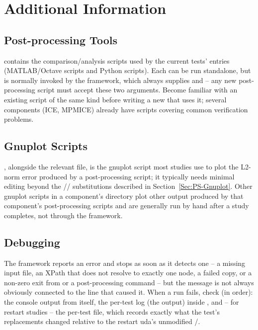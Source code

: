 \section{Additional Information}
\label{Sec:PS-AdditionalInfo}

\subsection{Post-processing Tools}

 contains the comparison/analysis scripts used by the current
tests'  entries (MATLAB/Octave  scripts and Python scripts). Each
can be run standalone, but is normally invoked by the framework, which always supplies  and  -- any new post-processing script must accept
these two arguments. Become familiar with an existing script of the same kind before writing a new
 that uses it; several components (ICE, MPMICE) already have scripts covering common
verification problems.

\subsection{Gnuplot Scripts}

, alongside the relevant  file, is the gnuplot script most studies use to
plot the L2-norm error produced by a post-processing script; it typically needs minimal editing
beyond the // substitutions described in
Section~\ref{Sec:PS-Gnuplot}. Other gnuplot scripts in a component's directory plot other output
produced by that component's post-processing scripts and are generally run by hand after a study
completes, not through the framework.

\subsection{Debugging}

The framework reports an error and stops as soon as it detects one -- a missing input file, an XPath
that does not resolve to exactly one node, a failed copy, or a non-zero exit from  or a
post-processing command -- but the message is not always obviously connected to the  line
that caused it. When a run fails, check (in order): the console output from  itself,
the per-test  log (the  output) inside
, and -- for restart studies -- the per-test
 file, which records exactly what the test's replacements changed relative
to the restart uda's unmodified /.

\endgroup



